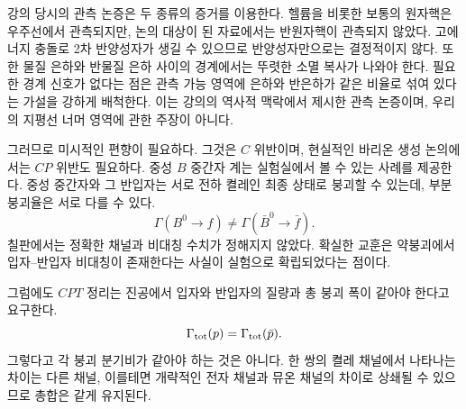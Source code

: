 강의 당시의 관측 논증은 두 종류의 증거를 이용한다. 헬륨을 비롯한 보통의 원자핵은 우주선에서 관측되지만, 논의 대상이 된 자료에서는 반원자핵이 관측되지 않았다. 고에너지 충돌로 2차 반양성자가 생길 수 있으므로 반양성자만으로는 결정적이지 않다. 또한 물질 은하와 반물질 은하 사이의 경계에서는 뚜렷한 소멸 복사가 나와야 한다. 필요한 경계 신호가 없다는 점은 관측 가능 영역에 은하와 반은하가 같은 비율로 섞여 있다는 가설을 강하게 배척한다. 이는 강의의 역사적 맥락에서 제시한 관측 논증이며, 우리의 지평선 너머 영역에 관한 주장이 아니다.

\begin{classroomqa}
\end{classroomqa}

그러므로 미시적인 편향이 필요하다. 그것은 \(C\) 위반이며, 현실적인 바리온 생성 논의에서는 \(CP\) 위반도 필요하다. 중성 \(B\) 중간자 계는 실험실에서 볼 수 있는 사례를 제공한다. 중성 중간자와 그 반입자는 서로 전하 켤레인 최종 상태로 붕괴할 수 있는데, 부분 붕괴율은 서로 다를 수 있다.
\begin{equation}
\Gamma(B^0\to f)\ne\Gamma(\bar B^0\to\bar f).
\label{eq:c08-cp-partial}
\end{equation}
칠판에서는 정확한 채널과 비대칭 수치가 정해지지 않았다. 확실한 교훈은 약붕괴에서 입자--반입자 비대칭이 존재한다는 사실이 실험으로 확립되었다는 점이다.

그럼에도 \(CPT\) 정리는 진공에서 입자와 반입자의 질량과 총 붕괴 폭이 같아야 한다고 요구한다.
\begin{equation}
\Gamma_{\rm tot}(p)=\Gamma_{\rm tot}(\bar p).
\end{equation}
그렇다고 각 붕괴 분기비가 같아야 하는 것은 아니다. 한 쌍의 켤레 채널에서 나타나는 차이는 다른 채널, 이를테면 개략적인 전자 채널과 뮤온 채널의 차이로 상쇄될 수 있으므로 총합은 같게 유지된다.

\begin{classroomqa}
\end{classroomqa}

